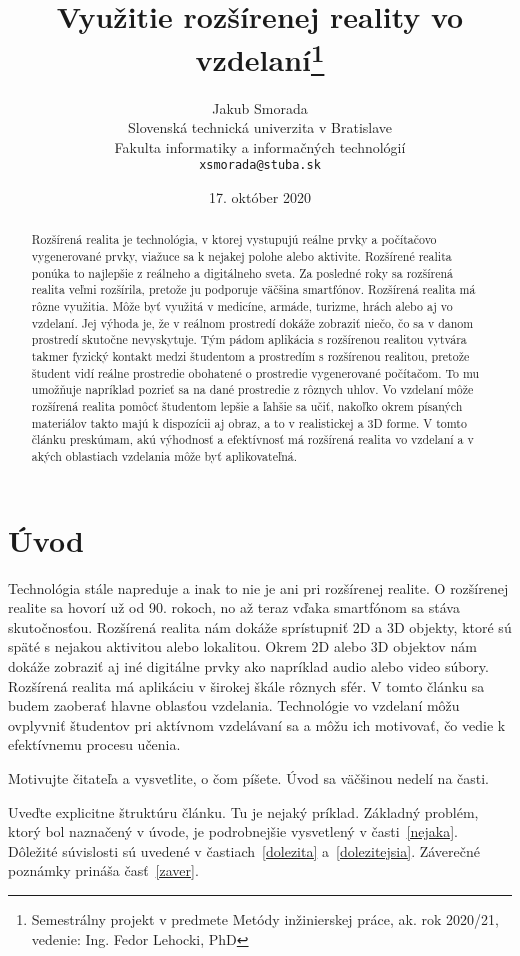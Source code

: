 \documentclass[10pt,twoside,slovak,a4paper]{article}
\title{Využitie rozšírenej reality vo vzdelaní\thanks{Semestrálny projekt v predmete Metódy inžinierskej práce, ak. rok 2020/21, vedenie: Ing. Fedor Lehocki, PhD}}
\author{Jakub Smorada\\[2pt]
	{\small Slovenská technická univerzita v Bratislave}\\
	{\small Fakulta informatiky a informačných technológií}\\
	{\small \texttt{xsmorada@stuba.sk}}
	}
\date{\small 17. október 2020}
\begin{document}
\maketitle

\begin{abstract}
Rozšírená realita je technológia, v ktorej vystupujú reálne prvky a počítačovo vygenerované prvky, viažuce sa k nejakej polohe alebo aktivite. 
Rozšírené realita ponúka to najlepšie z reálneho a digitálneho sveta. 
Za posledné roky sa rozšírená realita veľmi rozšírila, pretože ju podporuje väčšina smartfónov. 
Rozšírená realita má rôzne využitia. 
Môže byť využitá v medicíne, armáde, turizme, hrách alebo aj vo vzdelaní. 
Jej výhoda je, že v reálnom prostredí dokáže zobraziť niečo, čo sa v danom prostredí skutočne nevyskytuje. 
Tým pádom aplikácia s rozšírenou realitou vytvára takmer fyzický kontakt medzi študentom a prostredím s rozšírenou realitou, pretože študent vidí reálne prostredie obohatené o prostredie vygenerované počítačom. 
To mu umožňuje napríklad pozrieť sa na dané prostredie z rôznych uhlov. 
Vo vzdelaní môže rozšírená realita pomôcť študentom lepšie a ľahšie sa učiť, nakoľko okrem písaných materiálov takto majú k dispozícii aj obraz, a to v realistickej a 3D forme. 
V tomto článku preskúmam, akú výhodnosť a efektívnosť má rozšírená realita vo vzdelaní a v akých oblastiach vzdelania môže byť aplikovateľná.
\end{abstract}

\section{Úvod}
Technológia stále napreduje a inak to nie je ani pri rozšírenej realite.  
O rozšírenej realite sa hovorí už od 90. rokoch, no až teraz vďaka smartfónom sa stáva skutočnosťou. 
Rozšírená realita nám dokáže sprístupniť 2D a 3D objekty, ktoré sú späté s nejakou aktivitou alebo lokalitou. 
Okrem 2D alebo 3D objektov nám dokáže zobraziť aj iné digitálne prvky ako napríklad audio alebo video súbory. 
Rozšírená realita má aplikáciu v širokej škále rôznych sfér. V tomto článku sa budem zaoberať hlavne oblasťou vzdelania. 
Technológie vo vzdelaní môžu ovplyvniť študentov pri aktívnom vzdelávaní sa a môžu ich motivovať, čo vedie k efektívnemu procesu učenia.\cite{Saidin2015}

Motivujte čitateľa a vysvetlite, o čom píšete. Úvod sa väčšinou nedelí na časti.

Uveďte explicitne štruktúru článku. Tu je nejaký príklad.
Základný problém, ktorý bol naznačený v úvode, je podrobnejšie vysvetlený v časti~\ref{nejaka}.
Dôležité súvislosti sú uvedené v častiach~\ref{dolezita} a~\ref{dolezitejsia}.
Záverečné poznámky prináša časť~\ref{zaver}.
\end{document}

